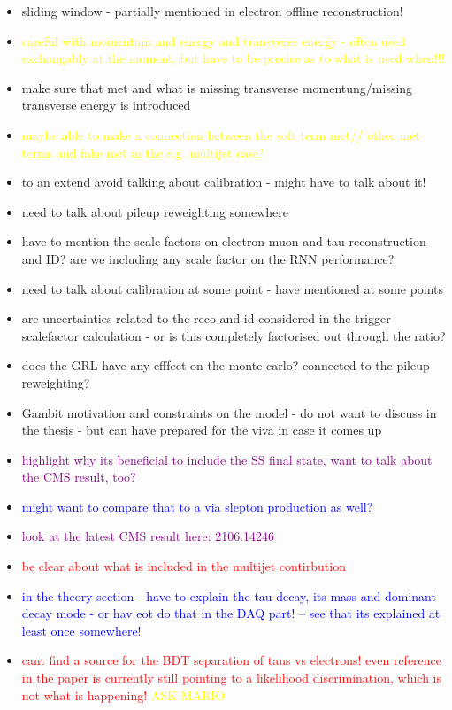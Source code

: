 \begin{itemize}
    \item sliding window - partially mentioned in electron offline reconstruction!
    \item \textcolor{yellow}{careful with momentum and energy and transverse energy - often used exchangably at the moment, but have to be precise as to what is used when!!!}
    \item make sure that met and what is missing transverse momentung/missing transverse energy is introduced
    \item \textcolor{yellow}{maybe able to make a connection between the soft term met// other met terms and fake met in the e.g. multijet case?}
    \item to an extend avoid talking about calibration - might have to talk about it!
    \item need to talk about pileup reweighting somewhere
    \item have to mention the scale factors on electron muon and tau reconstruction and ID? are we including any scale factor on the RNN performance?
    \item need to talk  about calibration at some point - have mentioned at some points 
    \item are uncertainties related to the reco and id considered in the trigger scalefactor calculation - or is this completely factorised out through the ratio?
    \item does the GRL have any efffect on the monte carlo? connected to the pileup reweighting? 
    \item Gambit motivation and constraints on the model - do not want to discuss in the thesis - but can have prepared for the viva in case it comes up
    \item \textcolor{purple}{highlight why its beneficial to include the SS final state, want to talk about the CMS result, too?}
    \item \textcolor{blue}{might want to compare that to a via slepton production as well?}
    \item \textcolor{purple}{look at the latest CMS result here: 2106.14246}
    \item \textcolor{red}{be clear about what is included in the multijet contirbution}
    \item \textcolor{blue}{in the theory section - have to explain the tau decay, its mass and dominant decay mode - or hav eot do that in the DAQ part! -- see that its explained at least once somewhere!}
    \item \textcolor{red}{cant find a source for the BDT separation of taus vs electrons! even reference in the paper is currently still pointing to a likelihood discrimination, which is not what is happening!} \textcolor{yellow}{ASK MARIO}

\end{itemize}
